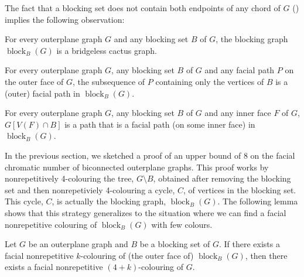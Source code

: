 \documentclass{patmorin}
\DeclareMathOperator{\block}{block}
\begin{document}
The fact that a blocking set does not contain both endpoints of any
chord of $G$ () implies the following observation:

\begin{obs}
   For every outerplane graph $G$ and any blocking set $B$ of $G$,
   the blocking graph $\block_B(G)$ is a bridgeless cactus graph.
\end{obs}


\begin{obs}
For every outerplane graph $G$, any blocking set $B$ of $G$ and any
facial path $P$ on the outer face of  $G$, the subsequence of $P$
containing only the vertices of $B$ is a (outer) facial path in $\block_B(G)$.
\end{obs}



\begin{obs}
For every outerplane graph $G$, any blocking set $B$ of $G$ and any
inner face $F$ of $G$, $G[V(F)\cap B]$ is a path that is a facial path (on
some inner face)  in $\block_B(G)$.
\end{obs}


In the previous section, we sketched a proof of an upper bound of
8 on the facial chromatic number of biconnected outerplane graphs.
This proof works by nonrepetitively 4-colouring the tree, $G\setminus B$, obtained after removing the blocking set and then nonrepetiviely
4-colouring a cycle, $C$, of vertices in the blocking set.  This cycle,
$C$, is actually the blocking graph, $\block_B(G)$.  The following lemma
shows that this strategy generalizes to the situation where we can find
a facial nonrepetitive colouring of $\block_B(G)$ with few colours.

\begin{lem}
  Let $G$ be an outerplane graph and $B$ be a blocking set of $G$. If
  there exists a facial nonrepetitive $k$-colouring of (the outer 
  face of) $\block_{B}(G)$, then there exists a facial nonrepetitive
  $(4+k)$-colouring of $G$.
\end{lem}
\end{document}
